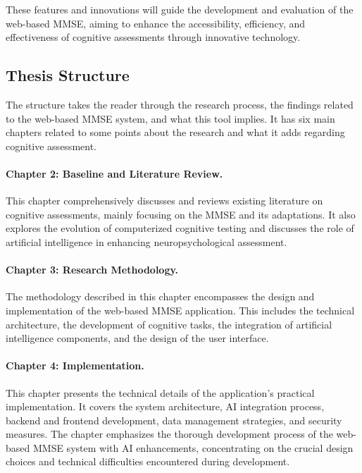 These features and innovations will guide the development and evaluation of the web-based MMSE, aiming to enhance the accessibility, efficiency, and effectiveness of cognitive assessments through innovative technology.

\subsection{Thesis Structure}

The structure takes the reader through the research process, the findings related to the web-based MMSE system, and what this tool implies. It has six main chapters related to some points about the research and what it adds regarding cognitive assessment.

\paragraph{Chapter 2: Baseline and Literature Review.} This chapter comprehensively discusses and reviews existing literature on cognitive assessments, mainly focusing on the MMSE and its adaptations. It also explores the evolution of computerized cognitive testing and discusses the role of artificial intelligence in enhancing neuropsychological assessment.

\paragraph{Chapter 3: Research Methodology.} The methodology described in this chapter encompasses the design and implementation of the web-based MMSE application. This includes the technical architecture, the development of cognitive tasks, the integration of artificial intelligence components, and the design of the user interface.

\paragraph{Chapter 4: Implementation.} This chapter presents the technical details of the application's practical implementation. It covers the system architecture, AI integration process, backend and frontend development, data management strategies, and security measures. The chapter emphasizes the thorough development process of the web-based MMSE system with AI enhancements, concentrating on the crucial design choices and technical difficulties encountered during development.

